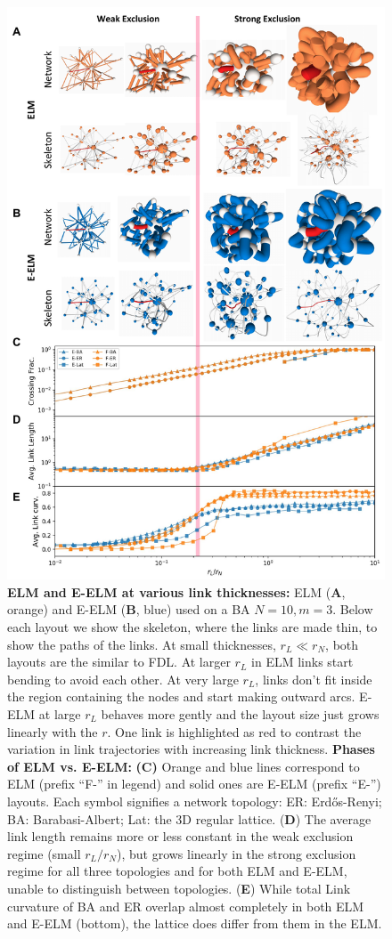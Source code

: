 \documentclass[nofootinbib,preprint,floatfix,titlepage,endfloats]{revtex4} %
\begin{document}
\begin{figure}
\centering
\vspace{-2cm}
\includegraphics[width=.69\columnwidth]{fig-09-19/phase-061717.pdf}
\caption{%
         \scriptsize {\bf ELM and E-ELM at various link thicknesses:} ELM ({\bf A}, orange) and E-ELM ({\bf B}, blue) used on a BA $N=10, m=3$. Below each layout we show the skeleton, where the links are made thin, to show the paths of the links.
         At small thicknesses, $r_L \ll r_N$, both layouts are the similar to FDL. At larger $r_L$ in ELM links start bending to avoid each other. 
         At very large $r_L$, links don't fit inside the region containing the nodes and start making outward arcs. 
         E-ELM at large $r_L$ behaves more gently and the layout size just grows linearly with the $r$.
         One link is highlighted as red to contrast the variation in link trajectories with increasing link thickness.
         {\bf Phases of ELM vs. E-ELM:} {\bf (C)} 
         Orange and blue lines correspond to ELM (prefix ``F-'' in legend) and solid ones are E-ELM (prefix ``E-'') layouts. Each symbol signifies a network topology: ER: Erdős-Renyi; BA: Barabasi-Albert; Lat: the 3D regular lattice.
         ({\bf D}) The average link length remains more or less constant in the weak exclusion regime (small $r_L/r_N$), but grows linearly in the strong exclusion regime for all three topologies and for both ELM and E-ELM, unable to distinguish between topologies.  
         ({\bf E}) While total Link curvature of BA and ER overlap almost completely in both ELM and E-ELM (bottom), the lattice does differ from them in the ELM. }    
    \label{fig:phase-compare}
\end{figure}
\end{document}
